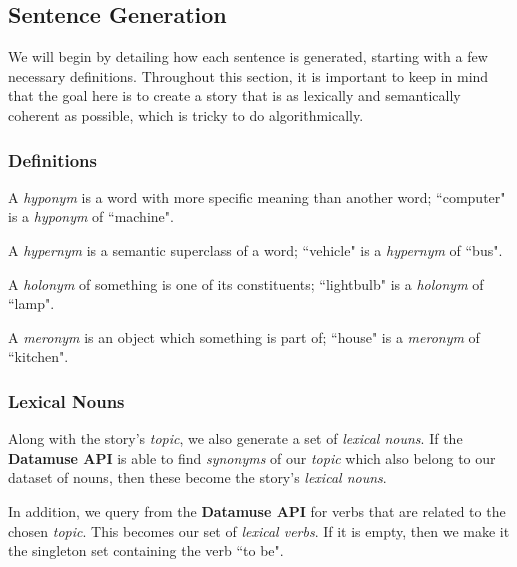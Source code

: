 \subsection{Sentence Generation}

We will begin by detailing how each sentence is generated, starting with a few necessary definitions. Throughout this section, it is important to keep in mind that the goal here is to create a story that is as lexically and semantically coherent as possible, which is tricky to do algorithmically.

\subsubsection{Definitions}

\begin{definition}[Hyponym]
A \textit{hyponym} is a word with more specific meaning than another word; ``computer" is a \textit{hyponym} of ``machine".
\end{definition}

\begin{definition}[Hypernym]
A \textit{hypernym} is a semantic superclass of a word; ``vehicle" is a \textit{hypernym} of ``bus".
\end{definition}

\begin{definition}[Holonym]
A \textit{holonym} of something is one of its constituents; ``lightbulb" is a \textit{holonym} of ``lamp".
\end{definition}

\begin{definition}[Meronym]
A \textit{meronym} is an object which something is part of; ``house" is a \textit{meronym} of ``kitchen".
\end{definition}

\subsubsection{Lexical Nouns}

Along with the story's \textit{topic}, we also generate a set of \textit{lexical nouns}. If the \textbf{Datamuse API} is able to find \textit{synonyms} of our \textit{topic} which also belong to our dataset of nouns, then these become the story's \textit{lexical nouns}.

In addition, we query from the \textbf{Datamuse API} for verbs that are related to the chosen \textit{topic}. This becomes our set of \textit{lexical verbs}. If it is empty, then we make it the singleton set containing the verb ``to be".

